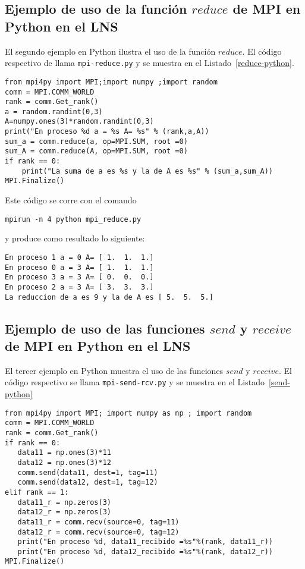 \documentclass[letter]{jpconf}
\begin{document}
\subsection{Ejemplo de uso de la funci\'on $reduce$ de MPI en Python en el LNS}
El segundo ejemplo en Python ilustra el uso de la funci\'on $reduce$. El c\'odigo respectivo de llama  \texttt{mpi-reduce.py} y se muestra en el Listado~\ref{reduce-python}.
\begin{lstlisting}[label=reduce-python,caption=Listado del programa  \texttt{mpi-reduce.py} en Python]
from mpi4py import MPI;import numpy ;import random
comm = MPI.COMM_WORLD
rank = comm.Get_rank()
a = random.randint(0,3)
A=numpy.ones(3)*random.randint(0,3)
print("En proceso %d a = %s A= %s" % (rank,a,A))
sum_a = comm.reduce(a, op=MPI.SUM, root =0)
sum_A = comm.reduce(A, op=MPI.SUM, root =0)
if rank == 0:
    print("La suma de a es %s y la de A es %s" % (sum_a,sum_A))
MPI.Finalize()
\end{lstlisting}


Este c\'odigo se corre con el comando
\color{blue}
\begin{verbatim}
mpirun -n 4 python mpi_reduce.py
\end{verbatim}
\color{black}
y produce como resultado lo siguiente:
\color{brown}
\begin{verbatim}
En proceso 1 a = 0 A= [ 1.  1.  1.]
En proceso 0 a = 3 A= [ 1.  1.  1.]
En proceso 3 a = 3 A= [ 0.  0.  0.]
En proceso 2 a = 3 A= [ 3.  3.  3.]
La reduccion de a es 9 y la de A es [ 5.  5.  5.]
\end{verbatim}
\color{black}

\subsection{Ejemplo de uso de las funciones $send$ y $receive$ de MPI en Python en el LNS}


El tercer ejemplo en Python muestra el uso de las funciones $send$ y $receive$. El c\'odigo respectivo se llama  \texttt{mpi-send-rcv.py} y se muestra en el Listado~\ref{send-python}
\begin{lstlisting}[float,floatplacement=H,label=send-python,caption=Listado del programa \texttt{mpi-send-rcv.py} en Python]
from mpi4py import MPI; import numpy as np ; import random
comm = MPI.COMM_WORLD
rank = comm.Get_rank()
if rank == 0:
   data11 = np.ones(3)*11
   data12 = np.ones(3)*12
   comm.send(data11, dest=1, tag=11)
   comm.send(data12, dest=1, tag=12)
elif rank == 1:
   data11_r = np.zeros(3)
   data12_r = np.zeros(3)
   data11_r = comm.recv(source=0, tag=11)
   data12_r = comm.recv(source=0, tag=12)
   print("En proceso %d, data11_recibido =%s"%(rank, data11_r))
   print("En proceso %d, data12_recibido =%s"%(rank, data12_r))
MPI.Finalize()
\end{lstlisting}
\end{document}
